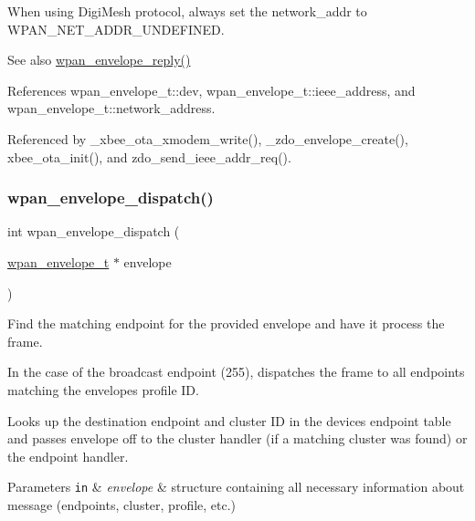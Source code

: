 When using Digi\+Mesh protocol, always set the {\ttfamily network\+\_\+addr} to W\+P\+A\+N\+\_\+\+N\+E\+T\+\_\+\+A\+D\+D\+R\+\_\+\+U\+N\+D\+E\+F\+I\+N\+ED.

\begin{DoxySeeAlso}{See also}
\hyperlink{group__wpan__aps_gaaaee02ff456d4f6103a5e94c2ba106c5}{wpan\+\_\+envelope\+\_\+reply()} 
\end{DoxySeeAlso}


References wpan\+\_\+envelope\+\_\+t\+::dev, wpan\+\_\+envelope\+\_\+t\+::ieee\+\_\+address, and wpan\+\_\+envelope\+\_\+t\+::network\+\_\+address.



Referenced by \+\_\+xbee\+\_\+ota\+\_\+xmodem\+\_\+write(), \+\_\+zdo\+\_\+envelope\+\_\+create(), xbee\+\_\+ota\+\_\+init(), and zdo\+\_\+send\+\_\+ieee\+\_\+addr\+\_\+req().

\mbox{\label{group__wpan__aps_gae84eafd10f51de6cdac4732b8948606d}} 
\subsubsection{\texorpdfstring{wpan\+\_\+envelope\+\_\+dispatch()}{wpan\_envelope\_dispatch()}}
{\footnotesize\ttfamily int wpan\+\_\+envelope\+\_\+dispatch (\begin{DoxyParamCaption}\item[{\hyperlink{structwpan__envelope__t}{wpan\+\_\+envelope\+\_\+t} $\ast$}]{envelope }\end{DoxyParamCaption})}



Find the matching endpoint for the provided {\ttfamily envelope} and have it process the frame. 

In the case of the broadcast endpoint (255), dispatches the frame to all endpoints matching the envelope\textquotesingle{}s profile ID.

Looks up the destination endpoint and cluster ID in the device\textquotesingle{}s endpoint table and passes {\ttfamily envelope} off to the cluster handler (if a matching cluster was found) or the endpoint handler.


\begin{DoxyParams}[1]{Parameters}
\mbox{\tt in}  & {\em envelope} & structure containing all necessary information about message (endpoints, cluster, profile, etc.)\\
\hline
\end{DoxyParams}

